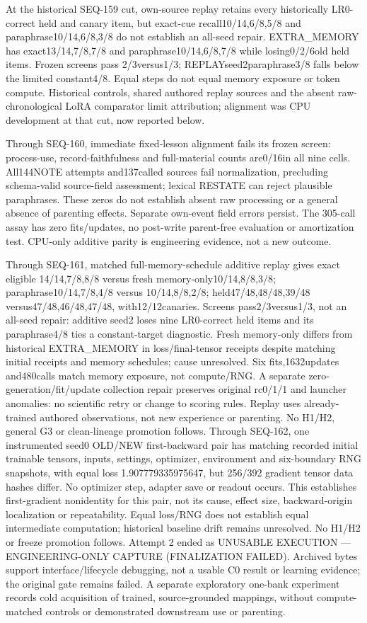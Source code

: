 \documentclass[11pt]{article}
\begin{document}
At the historical SEQ-159 cut, own-source replay retains every historically LR0-correct held
and canary item, but exact-cue recall10/14,6/8,5/8 and paraphrase10/14,6/8,3/8
do not establish an all-seed repair. EXTRA\_MEMORY has exact13/14,7/8,7/8 and
paraphrase10/14,6/8,7/8 while losing0/2/6old held items. Frozen screens pass
2/3versus1/3; REPLAYseed2paraphrase3/8 falls below the limited constant4/8.
Equal steps do not equal memory exposure or token compute. Historical controls,
shared authored replay sources and the absent raw-chronological LoRA comparator
limit attribution; alignment was CPU development at that cut, now reported below.

Through SEQ-160, immediate fixed-lesson alignment fails its frozen screen:
process-use, record-faithfulness and full-material counts are0/16in all nine
cells. All144NOTE attempts and137called sources fail normalization, precluding
schema-valid source-field assessment; lexical RESTATE can reject plausible
paraphrases. These zeros do not establish absent raw processing or a general
absence of parenting effects. Separate own-event field errors persist. The
305-call assay has zero fits/updates, no post-write parent-free evaluation or amortization
test. CPU-only additive parity is engineering evidence, not a new outcome.

Through SEQ-161, matched full-memory-schedule additive replay gives exact eligible
14/14,7/8,8/8 versus fresh memory-only10/14,8/8,3/8; paraphrase10/14,7/8,4/8 versus
10/14,8/8,2/8; held47/48,48/48,39/48 versus47/48,46/48,47/48, with12/12canaries.
Screens pass2/3versus1/3, not an all-seed repair: additive seed2 loses nine
LR0-correct held items and its paraphrase4/8 ties a constant-target diagnostic.
Fresh memory-only differs from historical EXTRA\_MEMORY in loss/final-tensor
receipts despite matching initial receipts and memory schedules; cause unresolved.
Six fits,1632updates and480calls match memory exposure, not compute/RNG. A separate
zero-generation/fit/update collection repair preserves original rc0/1/1 and
launcher anomalies: no scientific retry or change to scoring rules. Replay uses
already-trained authored observations, not new experience or parenting. No
H1/H2, general G3 or clean-lineage promotion follows.
Through SEQ-162, one instrumented seed0 OLD/NEW first-backward pair has
matching recorded initial trainable tensors, inputs, settings, optimizer,
environment and six-boundary RNG snapshots, with equal loss 1.907779335975647,
but 256/392 gradient tensor data hashes differ. No optimizer step, adapter save
or readout occurs. This establishes first-gradient nonidentity for this pair,
not its cause, effect size, backward-origin localization or repeatability.
Equal loss/RNG does not establish equal intermediate computation; historical
baseline drift remains unresolved. No H1/H2 or freeze promotion follows.
Attempt 2 ended as UNUSABLE EXECUTION --- ENGINEERING-ONLY CAPTURE
(FINALIZATION FAILED). Archived bytes support interface/lifecycle debugging,
not a usable C0 result or learning evidence; the original gate remains failed.
A separate exploratory one-bank experiment records cold acquisition of trained, source-grounded mappings, without compute-matched controls or demonstrated downstream use or parenting.
\end{document}
